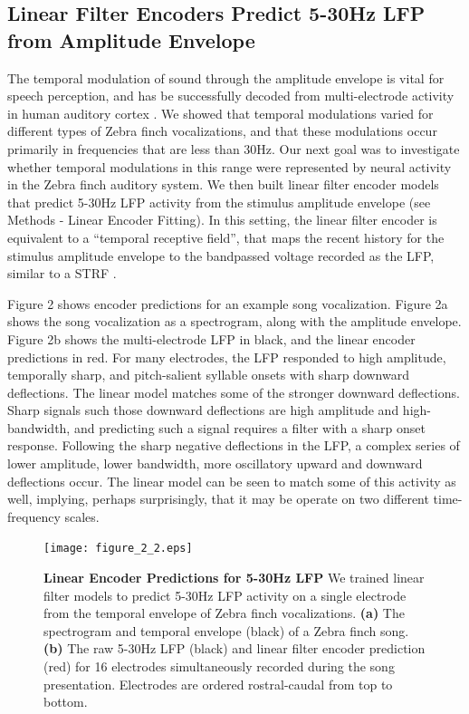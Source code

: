 \subsection{Linear Filter Encoders Predict 5-30Hz LFP from Amplitude Envelope}

The temporal modulation of sound through the amplitude envelope is vital for speech perception, and has be successfully decoded from multi-electrode activity in human auditory cortex \cite{Pasley2012}. We showed that temporal modulations varied for different types of Zebra finch vocalizations, and that these modulations occur primarily in frequencies that are less than 30Hz. Our next goal was to investigate whether temporal modulations in this range were represented by neural activity in the Zebra finch auditory system. We then built linear filter encoder models that predict 5-30Hz LFP activity from the stimulus amplitude envelope (see Methods - Linear Encoder Fitting). In this setting, the linear filter encoder is equivalent to a ``temporal receptive field'', that maps the recent history for the stimulus amplitude envelope to the bandpassed voltage recorded as the LFP, similar to a STRF \cite{Theunissen2000}.

    Figure 2 shows encoder predictions for an example song vocalization. Figure 2a shows the song vocalization as a spectrogram, along with the amplitude envelope. Figure 2b shows the multi-electrode LFP in black, and the linear encoder predictions in red.  For many electrodes, the LFP responded to high amplitude, temporally sharp, and pitch-salient syllable onsets with sharp downward deflections. The linear model matches some of the stronger downward deflections. Sharp signals such those downward deflections are high amplitude and high-bandwidth, and predicting such a signal requires a filter with a sharp onset response. Following the sharp negative deflections in the LFP, a complex series of lower amplitude, lower bandwidth, more oscillatory upward and downward deflections occur. The linear model can be seen to match some of this activity as well, implying, perhaps surprisingly, that it may be operate on two different time-frequency scales.

\begin{figure}
    \caption{\textbf{Linear Encoder Predictions for 5-30Hz LFP} We trained linear filter models to predict 5-30Hz LFP activity on a single electrode from the temporal envelope of Zebra finch vocalizations. \textbf{(a)} The spectrogram and temporal envelope (black) of a Zebra finch song. \textbf{(b)} The raw 5-30Hz LFP (black) and linear filter encoder prediction (red) for 16 electrodes simultaneously recorded during the song presentation. Electrodes are ordered rostral-caudal from top to bottom.}
    \centering
    \texttt{[image: figure\_2\_2.eps]}
\end{figure}

